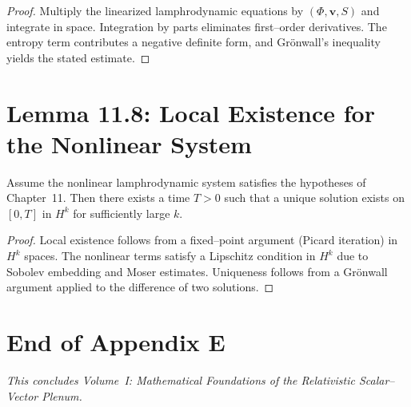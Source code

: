 \begin{proof}
Multiply the linearized lamphrodynamic equations by $(\Phi,\mathbf v,S)$ and integrate in space. Integration by parts eliminates first--order derivatives. The entropy term contributes a negative definite form, and Grönwall's inequality yields the stated estimate.
\end{proof}

\section{Lemma 11.8: Local Existence for the Nonlinear System}

\begin{lemma}[Lemma 11.8]
Assume the nonlinear lamphrodynamic system satisfies the hypotheses of Chapter~11. Then there exists a time $T>0$ such that a unique solution exists on $[0,T]$ in $H^k$ for sufficiently large $k$.
\end{lemma}

\begin{proof}
Local existence follows from a fixed--point argument (Picard iteration) in $H^k$ spaces. The nonlinear terms satisfy a Lipschitz condition in $H^k$ due to Sobolev embedding and Moser estimates. Uniqueness follows from a Grönwall argument applied to the difference of two solutions.
\end{proof}

\section{End of Appendix E}

\begin{center}
\textit{This concludes Volume~I: Mathematical Foundations of the Relativistic Scalar--Vector Plenum.}
\end{center}

